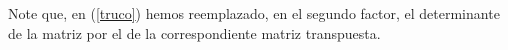 Note que, en (\ref{truco}) hemos reemplazado, en el segundo factor, el determinante de la matriz por el de la correspondiente matriz transpuesta. 

